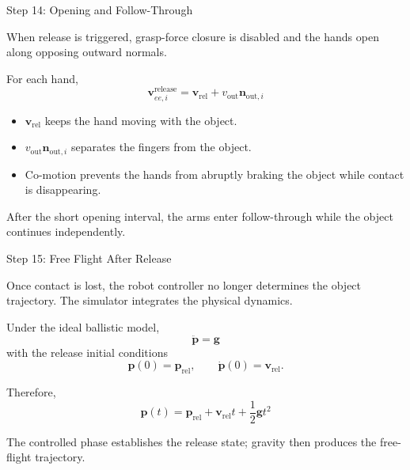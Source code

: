\documentclass[aspectratio=169]{beamer}
\newcommand{\vect}[1]{\bm{#1}}
\begin{document}
\begin{frame}{Step 14: Opening and Follow-Through}

When release is triggered, grasp-force closure is disabled and the hands
open along opposing outward normals.

For each hand,
\[
\boxed{
\vect{v}_{ee,i}^{\mathrm{release}}
=\vect{v}_{\mathrm{rel}}
+v_{\mathrm{out}}\vect{n}_{\mathrm{out},i}
}
\]

\begin{itemize}
    \item $\vect{v}_{\mathrm{rel}}$ keeps the hand moving with the object.
    \item $v_{\mathrm{out}}\vect{n}_{\mathrm{out},i}$ separates the fingers
          from the object.
    \item Co-motion prevents the hands from abruptly braking the object while
          contact is disappearing.
\end{itemize}

After the short opening interval, the arms enter follow-through while the
object continues independently.

\end{frame}

\begin{frame}{Step 15: Free Flight After Release}

Once contact is lost, the robot controller no longer determines the object
trajectory. The simulator integrates the physical dynamics.

Under the ideal ballistic model,
\[
\boxed{
\ddot{\vect{p}}=\vect{g}
}
\]
with the release initial conditions
\[
\vect{p}(0)=\vect{p}_{\mathrm{rel}},
\qquad
\dot{\vect{p}}(0)=\vect{v}_{\mathrm{rel}}.
\]

Therefore,
\[
\boxed{
\vect{p}(t)
=\vect{p}_{\mathrm{rel}}
+\vect{v}_{\mathrm{rel}}t
+\frac{1}{2}\vect{g}t^2
}
\]

The controlled phase establishes the release state; gravity then produces
the free-flight trajectory.

\end{frame}
\end{document}
